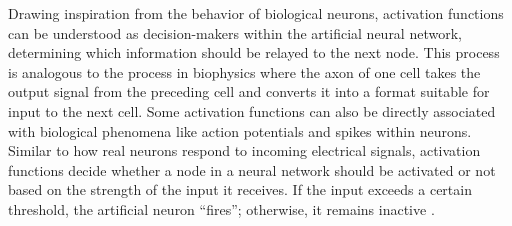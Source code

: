 \documentclass[a4paper, UKenglish, 11pt]{uiomaster}
\begin{document}
Drawing inspiration from the behavior of biological neurons, activation functions can be understood as decision-makers within the artificial neural network, determining which information should be relayed to the next node. This process is analogous to the process in biophysics where the axon of one cell takes the output signal from the preceding cell and converts it into a format suitable for input to the next cell. Some activation functions can also be directly associated with biological phenomena like action potentials and spikes within neurons. Similar to how real neurons respond to incoming electrical signals, activation functions decide whether a node in a neural network should be activated or not based on the strength of the input it receives. If the input exceeds a certain threshold, the artificial neuron ``fires''; otherwise, it remains inactive \cite{analyticsvidhya_activationfunctions}.
\end{document}
